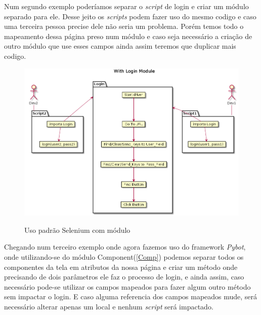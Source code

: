    \clearpage

    Num segundo exemplo poderíamos separar o \emph{script} de login e criar um módulo separado para ele. Desse jeito
    os \emph{scripts} podem fazer uso do mesmo codigo e caso uma terceira pessoa precise dele não seria um problema.
    Porém temos todo o mapeamento dessa página preso num módulo e caso seja necessário a criação de outro
    módulo que use esses campos ainda assim teremos que duplicar mais codigo.

    \begin{figure}[H]
        \vspace*{0,3cm}
        \centering
        \caption{Uso padrão Selenium com módulo}
        \includegraphics[width=1\textwidth]{./04-figuras/page_object_module}
        \label{fig:selenium_module}
    \end{figure}

    \clearpage
    Chegando num terceiro exemplo onde agora fazemos uso do framework \emph{Pybot}, onde utilizando-se do
    módulo Component(\ref{Comp}) podemos separar todos os componentes da tela em atributos da nossa página
    e criar um método onde precisando de dois parâmetros ele faz o processo de login, e ainda assim, caso
    necessário pode-se utilizar os campos mapeados para fazer algum outro método sem impactar o login.
    E caso alguma referencia dos campos mapeados mude, será necessário alterar apenas um local e nenhum \emph{script}
    será impactado.

